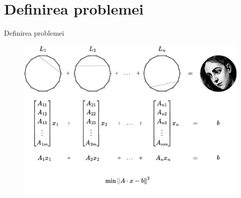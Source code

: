\documentclass[aspectratio=169,xcolor=dvipsnames]{beamer}
\begin{document}
\section{Definirea problemei}
\begin{frame}{Definirea problemei}
    \begin{figure}
        \includegraphics[width=0.75\linewidth]{images/problem_definition.pdf}
    \end{figure}
\end{frame}

\end{document}
